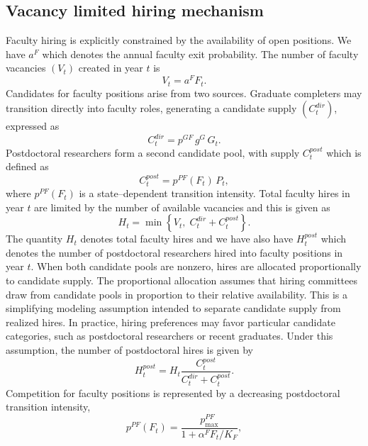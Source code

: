 \documentclass[3p]{elsarticle}%
\theoremstyle{definition}
\begin{document}
\subsection{Vacancy limited hiring mechanism}
\noindent Faculty hiring is explicitly constrained by the availability of open positions. We have $a^F$ which denotes the annual faculty exit probability. The number of faculty vacancies $(V_t)$ created in year $t$ is
\begin{equation}
V_t = a^F F_t .
\end{equation}
Candidates for faculty positions arise from two sources. Graduate completers may transition directly into faculty roles, generating a candidate supply $(C_t^{dir})$, expressed as
\begin{equation}
C_t^{dir} = p^{GF}\,g^G\,G_t .
\end{equation}
Postdoctoral researchers form a second candidate pool, with supply $C_t^{post}$ which is defined as
\begin{equation}\label{eq4}
C_t^{post} = p^{PF}(F_t)\,P_t ,
\end{equation}
where $p^{PF}(F_t)$ is a state--dependent transition intensity. Total faculty hires in year $t$ are limited by the number of available vacancies and this is given as
\begin{equation}\label{eq5}
H_t = \min \left\{ V_t,\; C_t^{dir} + C_t^{post} \right\}.
\end{equation}
The quantity $H_t$ denotes total faculty hires and we have also have $H_t^{post}$ which denotes the number of postdoctoral researchers hired into faculty positions in year $t$. When both candidate pools are nonzero, hires are allocated proportionally to candidate supply. The proportional allocation assumes that hiring committees draw from candidate pools in proportion to their relative availability. This is a simplifying modeling assumption intended to separate candidate supply from realized hires. In practice, hiring preferences may favor particular candidate categories, such as postdoctoral researchers or recent graduates. Under this assumption, the number of postdoctoral hires is given by
\begin{equation}\label{eq6}
H_t^{post} = H_t \frac{C_t^{post}}{C_t^{dir} + C_t^{post}} .
\end{equation}
Competition for faculty positions is represented by a decreasing postdoctoral transition intensity,
\begin{equation}
p^{PF}(F_t) = \frac{p^{PF}_{\max}}{1 + \alpha^F F_t / K_F} ,
\end{equation}
\end{document}
